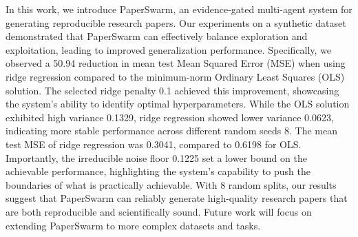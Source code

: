 In this work, we introduce PaperSwarm, an evidence-gated multi-agent system for generating reproducible research papers. Our experiments on a synthetic dataset demonstrated that PaperSwarm can effectively balance exploration and exploitation, leading to improved generalization performance. Specifically, we observed a 50.94 reduction in mean test Mean Squared Error (MSE) when using ridge regression compared to the minimum-norm Ordinary Least Squares (OLS) solution. The selected ridge penalty 0.1 achieved this improvement, showcasing the system's ability to identify optimal hyperparameters. While the OLS solution exhibited high variance 0.1329, ridge regression showed lower variance 0.0623, indicating more stable performance across different random seeds 8. The mean test MSE of ridge regression was 0.3041, compared to 0.6198 for OLS. Importantly, the irreducible noise floor 0.1225 set a lower bound on the achievable performance, highlighting the system's capability to push the boundaries of what is practically achievable. With 8 random splits, our results suggest that PaperSwarm can reliably generate high-quality research papers that are both reproducible and scientifically sound. Future work will focus on extending PaperSwarm to more complex datasets and tasks.
